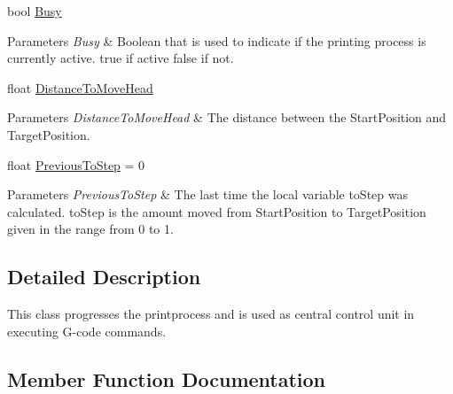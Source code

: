 \begin{DoxyCompactItemize}
bool \hyperlink{class_printer_abca967ea8795ac4a93a544b71f1e1fcc}{Busy}
\begin{DoxyCompactList}\small\item\em 
\begin{DoxyParams}{Parameters}
{\em Busy} & Boolean that is used to indicate if the printing process is currently active. true if active false if not.\\
\hline
\end{DoxyParams}
\end{DoxyCompactList}\item 
\mbox{\label{class_printer_a7dfe77b67ff6cff4f91c39fd58198049}} 
float \hyperlink{class_printer_a7dfe77b67ff6cff4f91c39fd58198049}{Distance\+To\+Move\+Head}
\begin{DoxyCompactList}\small\item\em 
\begin{DoxyParams}{Parameters}
{\em Distance\+To\+Move\+Head} & The distance between the Start\+Position and Target\+Position.\\
\hline
\end{DoxyParams}
\end{DoxyCompactList}\item 
\mbox{\label{class_printer_a38bab94c2ea7fa5f2a701581be0c3439}} 
float \hyperlink{class_printer_a38bab94c2ea7fa5f2a701581be0c3439}{Previous\+To\+Step} = 0
\begin{DoxyCompactList}\small\item\em 
\begin{DoxyParams}{Parameters}
{\em Previous\+To\+Step} & The last time the local variable to\+Step was calculated. to\+Step is the amount moved from Start\+Position to Target\+Position given in the range from 0 to 1.\\
\hline
\end{DoxyParams}
\end{DoxyCompactList}\end{DoxyCompactItemize}


\subsection{Detailed Description}
This class progresses the printprocess and is used as central control unit in executing G-\/code commands. 



\subsection{Member Function Documentation}
\mbox{\label{class_printer_abd07f61fbe01864e653c30c2712e9f90}} 
